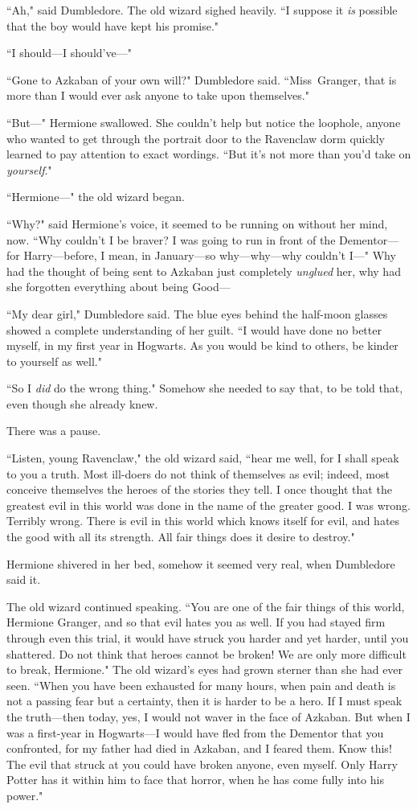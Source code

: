 ``Ah," said Dumbledore. The old wizard sighed heavily. ``I suppose it \emph{is} possible that the boy would have kept his promise."

``I should—I should've—"

``Gone to Azkaban of your own will?" Dumbledore said. ``Miss~Granger, that is more than I would ever ask anyone to take upon themselves."

``But—" Hermione swallowed. She couldn't help but notice the loophole, anyone who wanted to get through the portrait door to the Ravenclaw dorm quickly learned to pay attention to exact wordings. ``But it's not more than you'd take on \emph{yourself}."

``Hermione—" the old wizard began.

``Why?" said Hermione's voice, it seemed to be running on without her mind, now. ``Why couldn't I be braver? I was going to run in front of the Dementor—for Harry—before, I mean, in January—so why—why—why couldn't I—" Why had the thought of being sent to Azkaban just completely \emph{unglued} her, why had she forgotten everything about being Good—

``My dear girl," Dumbledore said. The blue eyes behind the half-moon glasses showed a complete understanding of her guilt. ``I would have done no better myself, in my first year in Hogwarts. As you would be kind to others, be kinder to yourself as well."

``So I \emph{did} do the wrong thing." Somehow she needed to say that, to be told that, even though she already knew.

There was a pause.

``Listen, young Ravenclaw," the old wizard said, ``hear me well, for I shall speak to you a truth. Most ill-doers do not think of themselves as evil; indeed, most conceive themselves the heroes of the stories they tell. I once thought that the greatest evil in this world was done in the name of the greater good. I was wrong. Terribly wrong. There is evil in this world which knows itself for evil, and hates the good with all its strength. All fair things does it desire to destroy."

Hermione shivered in her bed, somehow it seemed very real, when Dumbledore said it.

The old wizard continued speaking. ``You are one of the fair things of this world, Hermione Granger, and so that evil hates you as well. If you had stayed firm through even this trial, it would have struck you harder and yet harder, until you shattered. Do not think that heroes cannot be broken! We are only more difficult to break, Hermione." The old wizard's eyes had grown sterner than she had ever seen. ``When you have been exhausted for many hours, when pain and death is not a passing fear but a certainty, then it is harder to be a hero. If I must speak the truth—then today, yes, I would not waver in the face of Azkaban. But when I was a first-year in Hogwarts—I would have fled from the Dementor that you confronted, for my father had died in Azkaban, and I feared them. Know this! The evil that struck at you could have broken anyone, even myself. Only Harry Potter has it within him to face that horror, when he has come fully into his power."

